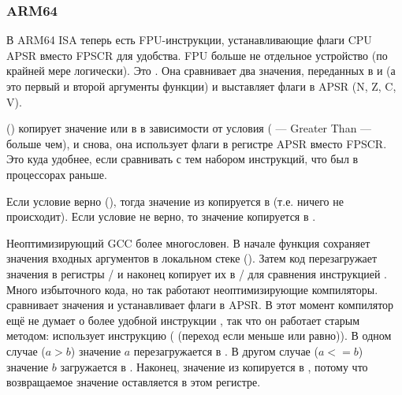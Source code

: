 \subsubsection{ARM64}




В ARM64 \ac{ISA} теперь есть FPU-инструкции, устанавливающие флаги CPU \ac{APSR} вместо \ac{FPSCR} для удобства.
\ac{FPU} больше не отдельное устройство (по крайней мере логически).
Это . Она сравнивает два значения, переданных в  и  
(а это первый и второй аргументы функции) и выставляет флаги в \ac{APSR} (N, Z, C, V).

 () копирует значение  или
 в  в зависимости от условия 
( --- Greater Than --- больше чем),
и снова, она использует флаги в регистре \ac{APSR} вместо \ac{FPSCR}.
Это куда удобнее, если сравнивать с тем набором инструкций, что был в процессорах раньше.

Если условие верно (), тогда значение из  копируется в  (т.е. ничего не происходит).
Если условие не верно, то значение  копируется в .




Неоптимизирующий GCC более многословен.
В начале функция сохраняет значения входных аргументов в локальном стеке ().
Затем код перезагружает значения в регистры
/ и наконец копирует их в 
/ для сравнения инструкцией . 
Много избыточного кода, но так работают неоптимизирующие компиляторы.
 сравнивает значения и устанавливает флаги в \ac{APSR}.
В этот момент компилятор ещё не думает о более удобной инструкции , так что он работает старым 
методом: 
использует инструкцию  ( (переход если меньше или равно)).
В одном случае ($a>b$) значение $a$ перезагружается в .
В другом случае ($a<=b$) значение $b$ загружается в .
Наконец, значение из  копируется в , 
потому что возвращаемое значение оставляется в этом регистре.

